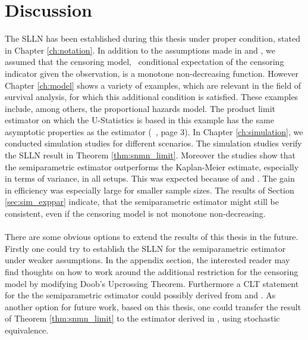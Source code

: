 \chapter{Discussion}
%
The SLLN has been established during this thesis under proper condition, stated in Chapter \ref{ch:notation}. In addition to the assumptions made in \cite{dikta2000strong} and \cite{bose1999strong}, we assumed that the censoring model, \ie\ conditional expectation of the censoring indicator given the observation, is a monotone non-decreasing function. However Chapter \ref{ch:model} shows a variety of examples, which are relevant in the field of survival analysis, for which this additional condition is satisfied. These examples include, among others, the proportional hazards model. The product limit estimator on which the U-Statistics is based in this example has the same asymptotic properties as the \cite{cheng1987mle} estimator (\cf\ \cite{dikta2000strong}, page 3). In Chapter \ref{ch:simulation}, we conducted simulation studies for different scenarios. The simulation studies verify the SLLN result in Theorem \ref{thm:snmn_limit}. Moreover the studies show that the semiparametric estimator outperforms the Kaplan-Meier estimate, especially in terms of variance, in all setups. This was expected because of \cite{dikta2005central} and \cite{dikta2014efficient}. The gain in efficiency was especially large for smaller sample sizes. The results of Section \ref{sec:sim_exppar} indicate, that the semiparametric estimator might still be consistent, even if the censoring model is not monotone non-decreasing.\\
\\
There are some obvious options to extend the results of this thesis in the future. Firstly one could try to establish the SLLN for the semiparametric estimator under weaker assumptions. In the appendix section, the interested reader may find thoughts on how to work around the additional restriction for the censoring model by modifying Doob's Upcrossing Theorem. Furthermore a CLT statement for the the semiparametric estimator could possibly derived from \cite{dikta2005central} and \cite{bose2002asymptotic}. As another option for future work, based on this thesis, one could transfer the result of Theorem \ref{thm:snmn_limit} to the estimator derived in \cite{dikta2016volterra}, using stochastic equivalence. 